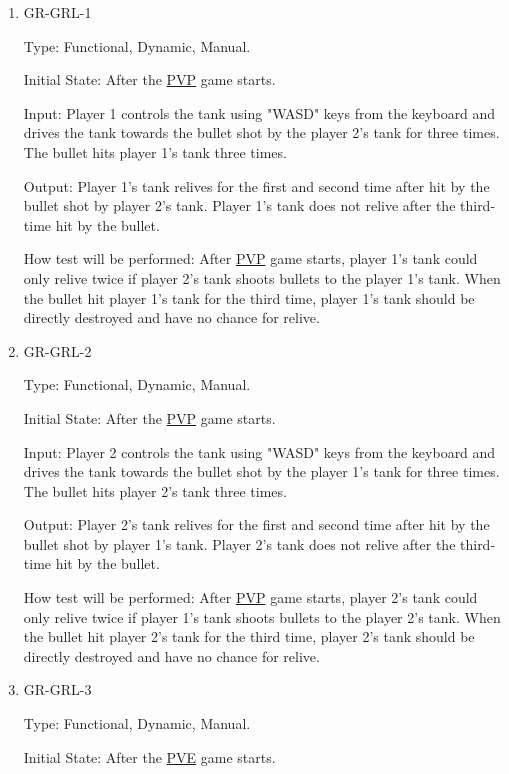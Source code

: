 \documentclass[12pt, titlepage]{article}
\begin{document}
\begin{enumerate}

\item{GR-GRL-1\\}

Type: Functional, Dynamic, Manual.
					
Initial State: After the \underline{PVP} game starts. 
					
Input: Player 1 controls the tank using "WASD" keys from the keyboard and drives the tank towards the bullet shot by the player 2's tank for three times. The bullet hits player 1's tank three times.
					
Output: Player 1's tank relives for the first and second time after hit by the bullet shot by player 2's tank. Player 1's tank does not relive after the third-time hit by the bullet.
					
How test will be performed: After \underline{PVP} game starts, player 1's tank could only relive twice if player 2's tank shoots bullets to the player 1's tank. When the bullet hit player 1's tank for the third time, player 1's tank should be directly destroyed and have no chance for relive.

\item{GR-GRL-2\\}

Type: Functional, Dynamic, Manual.
					
Initial State: After the \underline{PVP} game starts.
					
Input: Player 2 controls the tank using "WASD" keys from the keyboard and drives the tank towards the bullet shot by the player 1's tank for three times. The bullet hits player 2's tank three times.
					
Output: Player 2's tank relives for the first and second time after hit by the bullet shot by player 1's tank. Player 2's tank does not relive after the third-time hit by the bullet.
					
How test will be performed: After \underline{PVP} game starts, player 2's tank could only relive twice if player 1's tank shoots bullets to the player 2's tank. When the bullet hit player 2's tank for the third time, player 2's tank should be directly destroyed and have no chance for relive.

\item{GR-GRL-3\\}

Type: Functional, Dynamic, Manual.
					
Initial State: After the \underline{PVE} game starts.
					

\end{enumerate}
\end{document}
